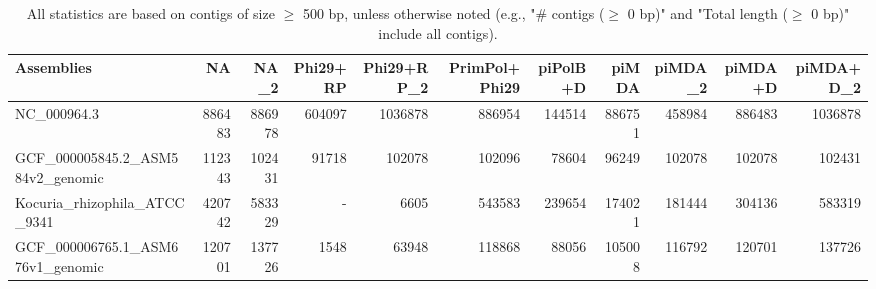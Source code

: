 \documentclass[12pt,a4paper]{article}
\begin{document}
\begin{table}[ht]
\begin{center}
\caption{All statistics are based on contigs of size $\geq$ 500 bp, unless otherwise noted (e.g., "\# contigs ($\geq$ 0 bp)" and "Total length ($\geq$ 0 bp)" include all contigs).}
\begin{tabular}{|l*{10}{|r}|}
\hline
Assemblies & NA & NA\_2 & Phi29+RP & Phi29+RP\_2 & PrimPol+Phi29 & piPolB+D & piMDA & piMDA\_2 & piMDA+D & piMDA+D\_2 \\ \hline
NC\_000964.3 & 886483 & 886978 & 604097 & 1036878 & 886954 & 144514 & 886751 & 458984 & 886483 & 1036878 \\ \hline
GCF\_000005845.2\_ASM584v2\_genomic & 112343 & 102431 & 91718 & 102078 & 102096 & 78604 & 96249 & 102078 & 102078 & 102431 \\ \hline
Kocuria\_rhizophila\_ATCC\_9341 & 420742 & 583329 & - & 6605 & 543583 & 239654 & 174021 & 181444 & 304136 & 583319 \\ \hline
GCF\_000006765.1\_ASM676v1\_genomic & 120701 & 137726 & 1548 & 63948 & 118868 & 88056 & 105008 & 116792 & 120701 & 137726 \\ \hline
\end{tabular}
\end{center}
\end{table}
\end{document}
